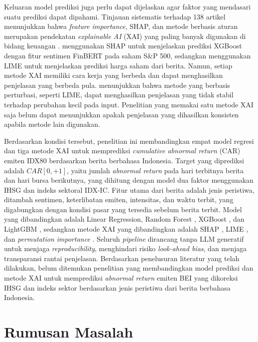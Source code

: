 Keluaran model prediksi juga perlu dapat dijelaskan agar faktor yang mendasari suatu prediksi dapat dipahami. Tinjauan sistematis terhadap 138 artikel menunjukkan bahwa \emph{feature importance}, SHAP, dan metode berbasis aturan merupakan pendekatan \emph{explainable AI} (XAI) yang paling banyak digunakan di bidang keuangan \autocite{cerneviciene2024}. \textcite{ruan2025} menggunakan SHAP untuk menjelaskan prediksi XGBoost dengan fitur sentimen FinBERT pada saham S\&P 500, sedangkan \textcite{gite2021} menggunakan LIME untuk menjelaskan prediksi harga saham dari berita. Namun, setiap metode XAI memiliki cara kerja yang berbeda dan dapat menghasilkan penjelasan yang berbeda pula. \textcite{alvarezmelis2018} menunjukkan bahwa metode yang berbasis perturbasi, seperti LIME, dapat menghasilkan penjelasan yang tidak stabil terhadap perubahan kecil pada input. Penelitian yang memakai satu metode XAI saja belum dapat menunjukkan apakah penjelasan yang dihasilkan konsisten apabila metode lain digunakan.

Berdasarkan kondisi tersebut, penelitian ini membandingkan empat model regresi dan tiga metode XAI untuk memprediksi \emph{cumulative abnormal return} (CAR) emiten IDX80 berdasarkan berita berbahasa Indonesia. Target yang diprediksi adalah $CAR[0,+1]$, yaitu jumlah \emph{abnormal return} pada hari terbitnya berita dan hari bursa berikutnya, yang dihitung dengan model dua faktor menggunakan IHSG dan indeks sektoral IDX-IC. Fitur utama dari berita adalah jenis peristiwa, ditambah sentimen, keterlibatan emiten, intensitas, dan waktu terbit, yang digabungkan dengan kondisi pasar yang tersedia sebelum berita terbit. Model yang dibandingkan adalah Linear Regression, Random Forest \autocite{breiman2001}, XGBoost \autocite{chen2016}, dan LightGBM \autocite{ke2017}, sedangkan metode XAI yang dibandingkan adalah SHAP \autocite{lundberg2017}, LIME \autocite{ribeiro2016}, dan \emph{permutation importance} \autocite{fisher2019}. Seluruh \emph{pipeline} dirancang tanpa LLM generatif untuk menjaga \emph{reproducibility}, menghindari risiko \emph{look-ahead bias}, dan menjaga transparansi rantai penjelasan. Berdasarkan penelusuran literatur yang telah dilakukan, belum ditemukan penelitian yang membandingkan model prediksi dan metode XAI untuk memprediksi \emph{abnormal return} emiten BEI yang dikoreksi IHSG dan indeks sektor berdasarkan jenis peristiwa dari berita berbahasa Indonesia.

\section{Rumusan Masalah}

